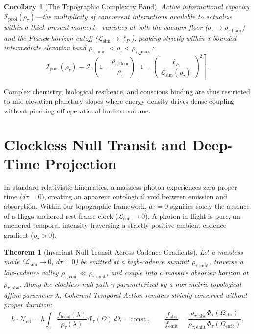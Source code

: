 \documentclass[11pt,a4paper]{article}
\newtheorem{theorem}{Theorem}[section]
\newtheorem{corollary}{Corollary}[section]
\theoremstyle{remark}
\begin{document}
\begin{corollary}[The Topographic Complexity Band]
Active informational capacity $\mathcal{I}_{\mathrm{pool}}(\rho_\tau)$---the multiplicity of concurrent interactions available to actualize within a thick present moment---vanishes at both the vacuum floor ($\rho_\tau \to \rho_{\tau,\mathrm{floor}}$) and the Planck horizon cutoff ($\mathcal{L}_{\mathrm{sim}} \to \ell_P$), peaking strictly within a bounded intermediate elevation band $\rho_{\tau,\min} < \rho_\tau < \rho_{\tau,\max}$:
\begin{equation}
\mathcal{I}_{\mathrm{pool}}(\rho_\tau) = \mathcal{I}_0 \left(1 - \frac{\rho_{\tau,\mathrm{floor}}}{\rho_\tau}\right) \left[1 - \left(\frac{\ell_P}{\mathcal{L}_{\mathrm{sim}}(\rho_\tau)}\right)^2\right].
\end{equation}
\end{corollary}
Complex chemistry, biological resilience, and conscious binding are thus restricted to mid-elevation planetary slopes where energy density drives dense coupling without pinching off operational horizon volume.

\section{Clockless Null Transit and Deep-Time Projection}

In standard relativistic kinematics, a massless photon experiences zero proper time ($d\tau = 0$), creating an apparent ontological void between emission and absorption. Within our topographic framework, $d\tau = 0$ signifies solely the absence of a Higgs-anchored rest-frame clock ($\mathcal{L}_{\mathrm{sim}} \to 0$). A photon in flight is pure, un-anchored temporal intensity traversing a strictly positive ambient cadence gradient ($\rho_\tau > 0$).

\begin{theorem}[Invariant Null Transit Across Cadence Gradients]
Let a massless mode ($\mathcal{L}_{\mathrm{sim}} \to 0$, $d\tau = 0$) be emitted at a high-cadence summit $\rho_{\tau,\mathrm{emit}}$, traverse a low-cadence valley $\rho_{\tau,\mathrm{void}} \ll \rho_{\tau,\mathrm{emit}}$, and couple into a massive absorber horizon at $\rho_{\tau,\mathrm{abs}}$. Along the clockless null path $\gamma$ parameterized by a non-metric topological affine parameter $\lambda$, Coherent Temporal Action remains strictly conserved without proper duration:
\begin{equation}
h \cdot \mathcal{N}_{\mathrm{eff}} = h \int_{\gamma} \frac{f_{\mathrm{local}}(\lambda)}{\rho_\tau(\lambda)} \, \Phi_\tau(\Omega) \, d\lambda = \mathrm{const.}, \qquad \frac{f_{\mathrm{abs}}}{f_{\mathrm{emit}}} = \frac{\rho_{\tau,\mathrm{abs}} \, \Phi_\tau(\Omega_{\mathrm{abs}})}{\rho_{\tau,\mathrm{emit}} \, \Phi_\tau(\Omega_{\mathrm{emit}})}.
\end{equation}
\end{theorem}
\end{document}

